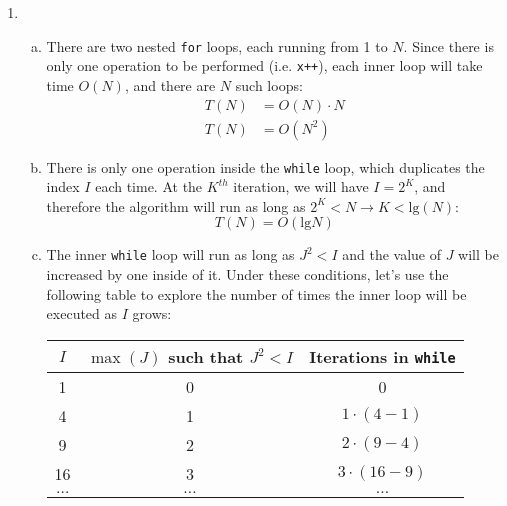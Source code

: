 \documentclass{article}
\begin{document}
\begin{enumerate}[1.]
    \item
        \begin{enumerate}[(a)]
	        \item There are two nested \texttt{for} loops, each running from 1 to $N$. Since there is only one operation to be performed (i.e. \texttt{x++}), each inner loop will take time $O(N)$, and there are $N$ such loops:
	        \begin{align*}
	            T(N) &= O(N) \cdot N \\
	            T(N) &= O(N^2)
	        \end{align*}
	        \item There is only one operation inside the \texttt{while} loop, which duplicates the index $I$ each time. At the $K^{th}$ iteration, we will have $I = 2^K$, and therefore the algorithm will run as long as $2^K < N \rightarrow K < \text{lg}(N)$:
	        \begin{equation*}
	            T(N) = O(\text{lg}N)
	        \end{equation*}
	        \item The inner \texttt{while} loop will run as long as $J^2 < I$ and the value of $J$ will be increased by one inside of it. Under these conditions, let's use the following table to explore the number of times the inner loop will be executed as $I$ grows:
	        \begin{table}[h!t]
	            \centering
	            \begin{tabular}{ccc}
	            \toprule
	            $I$ & $\max(J)$ such that $J^2 < I$ & Iterations in \texttt{while}\\
	            \midrule
	            1 & 0 & 0 \\
	            4 & 1 & $1 \cdot (4 - 1)$ \\
	            9 & 2 & $2 \cdot (9 - 4)$ \\
	            16 & 3 & $3 \cdot (16 - 9)$ \\
	            $\ldots$ & $\ldots$ & $\ldots$ \\
	            \bottomrule
	            \end{tabular}
            \end{table}
            

\end{enumerate}
\end{enumerate}
\end{document}
